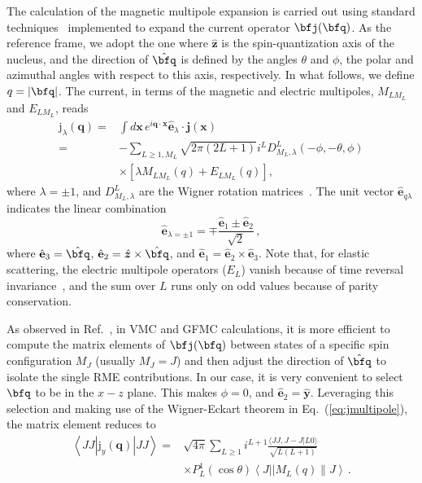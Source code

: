 \documentclass[aps,prc,floatfix,showpacs,twocolumn, preprintnumbers]{revtex4-2}
\begin{document}
The calculation of the magnetic multipole expansion is carried out using standard techniques~\cite{Walecka1995} implemented to expand the current operator $\bfj(\bfq)$. 
As the reference frame, we adopt the one where $\hat{\bm{z}}$ is the spin-quantization
axis of the nucleus, and the direction of $\hat{\bfq}$ is defined by the angles $\theta$ and $\phi$, the polar and azimuthal angles with respect to this axis, respectively. In what follows, we define $q=|\bfq|$. The current, in terms of the magnetic and electric multipoles, $M_{L M_L}$ and $E_{L M_L}$,  reads
\begin{equation}
\begin{aligned}
\mathrm{j}_{\lambda}(\mathbf{q})= & \int d \mathbf{x}\, e^{i \mathbf{q} \cdot \mathbf{x}} \hat{\mathbf{e}}_{\lambda} \cdot \mathbf{j}(\mathbf{x}) \\
= & -\sum_{L \geq 1,M_L} \sqrt{2 \pi(2 L+1)} i^L D_{M_L, \lambda}^L(-\phi,-\theta, \phi)\\
&\times  \left[\lambda M_{L M_L}(q)+E_{L M_L}(q)\right], \label{eq:jmultipole}
\end{aligned}
\end{equation}
where $\lambda=\pm1$, and $D_{M_L, \lambda}^L$ are the Wigner rotation matrices~\cite{Edmonds1957}. The unit vector $\hat{\mathbf{e}}_{q \lambda}$ indicates
the linear combination
\begin{equation}
  \hat{\mathbf{e}}_{\lambda=\pm1}=\mp\frac{\hat{\mathbf{e}}_{1}\pm\hat{\mathbf{e}}_{2}}{\sqrt{2}}\,,
\end{equation}
where $\hat{\mathbf{e}}_{3}=\hat{\bfq}$, $\hat{\mathbf{e}}_{2}=\hat{\bm{z}}\times\hat{\bfq}$,
and $\hat{\mathbf{e}}_{1}=\hat{\mathbf{e}}_{2}\times\hat{\mathbf{e}}_{3}$. 
Note that, for elastic scattering, the electric multipole operators ($E_L$) vanish because of time reversal
invariance~\cite{Forest1966}, and the sum over $L$ runs only on odd values because of parity conservation.

As observed in Ref.~\cite{Carlson2015}, in VMC and GFMC calculations, it
is more efficient to compute the matrix elements  of $\bfj(\bfq)$ between states of a specific spin configuration $M_J$ (usually $M_J=J$) and then adjust the direction of $\hat{\bfq}$ to isolate the single RME contributions. In our case, it is very convenient to select $\bfq$ to be in the $x-z$ plane. This  makes $\phi=0$, and  $\hat{\mathbf{e}}_2=\hat{\bm y}$. Leveraging this selection and making use of the Wigner-Eckart theorem in Eq.~(\ref{eq:jmultipole}), the  matrix element reduces to~\cite{Carlson2015}
\begin{equation}
\begin{aligned}\label{eq:mej}
 \left\langle J J \left|\mathrm{j}_{y}(\mathbf{q})\right| J J\right\rangle
= &\sqrt{4 \pi}\sum_{L \geq 1} i^{L+1}  \frac{\langle J J, J -\!J| L 0 \rangle}{\sqrt{L(L+1)}} \\
&\times P^1_L(\cos \theta)\left\langle J|| M_L(q) \| J\right\rangle\,.
\end{aligned}
\end{equation}
\end{document}
